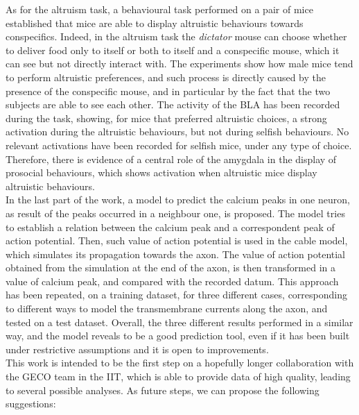 \documentclass[12pt, a4paper]{report}
\begin{document}
As for the altruism task, a behavioural task performed on a pair of mice established that mice are able to display altruistic behaviours towards conspecifics. Indeed, in the altruism task the \textit{dictator} mouse can choose whether to deliver food only to itself or both to itself and a conspecific mouse, which it can see but not directly interact with. The experiments show how male mice tend to perform altruistic preferences, and such process is directly caused by the presence of the conspecific mouse, and in particular  by the fact that the two subjects are able to see each other. The activity of the BLA has been recorded during the task, showing, for mice that preferred altruistic choices, a strong activation during the altruistic behaviours, but not during selfish behaviours. No relevant activations have been recorded for selfish mice, under any type of choice. Therefore, there is evidence of a central role of the amygdala in the display of prosocial behaviours, which shows activation when altruistic mice display altruistic behaviours.\\

In the last part of the work, a model to predict the calcium peaks in one neuron, as result of the peaks occurred in a neighbour one, is proposed. The model tries to establish a relation between the calcium peak and a correspondent peak of action potential. Then, such value of action potential is used in the cable model, which simulates its propagation towards the axon. The value of action potential obtained from the simulation at the end of the axon, is then transformed in a value of calcium peak, and compared with the recorded datum. This approach has been repeated, on a training dataset, for three different cases, corresponding to different ways to model the transmembrane currents along the axon, and tested on a test dataset. Overall, the three different results performed in a similar way, and the model reveals to be a good prediction tool, even if it has been built under restrictive assumptions and it is open to improvements.\\

This work is intended to be the first step on a hopefully longer collaboration with the GECO team in the IIT, which is able to provide data of high quality, leading to several possible analyses. As future steps, we can propose the following suggestions:
\end{document}
